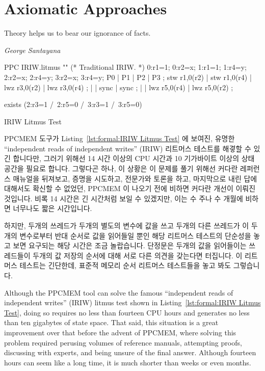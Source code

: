 
\section{Axiomatic Approaches}
\label{sec:formal:Axiomatic Approaches}
%
\epigraph{Theory helps us to bear our ignorance of facts.}
	{\emph{George Santayana}}

\begin{listing}[tb]
\begin{linelabel}
\begin{VerbatimL}[commandchars=\%\@\$]
PPC IRIW.litmus
""
(* Traditional IRIW. *)
{
0:r1=1; 0:r2=x;
1:r1=1;         1:r4=y;
        2:r2=x; 2:r4=y;
        3:r2=x; 3:r4=y;
}
P0           | P1           | P2           | P3           ;
stw r1,0(r2) | stw r1,0(r4) | lwz r3,0(r2) | lwz r3,0(r4) ;
             |              | sync         | sync         ;
             |              | lwz r5,0(r4) | lwz r5,0(r2) ;

exists
(2:r3=1 /\ 2:r5=0 /\ 3:r3=1 /\ 3:r5=0)
\end{VerbatimL}
\end{linelabel}
\caption{IRIW Litmus Test}
\label{lst:formal:IRIW Litmus Test}
\end{listing}

PPCMEM 도구가
Listing~\ref{lst:formal:IRIW Litmus Test} 에 보여진,
유명한 ``independent reads of independent writes'' (IRIW) 리트머스 테스트를
해곃할 수 있긴 합니다만, 그러기 위해선 14 시간 이상의 CPU 시간과 10 기가바이트
이상의 상태공간을 필요로 합니다.
그렇다곤 하나, 이 상황은 이 문제를 풀기 위해선 커다란 레퍼런스 매뉴얼을
뒤져보고, 증명을 시도하고, 전문가와 토론을 하고, 마지막으로 내린 답에 대해서도
확신할 수 없었던, PPCMEM 이 나오기 전에 비하면 커다란 개선이 이뤄진 것입니다.
비록 14 시간은 긴 시간처럼 보일 수 있겠지만, 이는 수 주나 수 개월에 비하면
너무나도 짧은 시간입니다.

하지만, 두개의 쓰레드가 두개의 별도의 변수에 값을 쓰고 두개의 다른 쓰레드가 이
두개의 변수로부터 반대 순서로 값을 읽어들일 뿐인 해당 리트머스 테스트의
단순성을 놓고 보면 요구되는 해당 시간은 조금 놀랍습니다.
단정문은 두개의 값을 읽어들이는 쓰레드들이 두개의 값 저장의 순서에 대해 서로
다른 의견을 갖는다면 터집니다.
이 리트머스 테스트는 긴단한데, 표준적 메모리 순서 리트머스 테스트들을 놓고 봐도
그렇습니다.
\iffalse

Although the PPCMEM tool can solve the famous ``independent reads of
independent writes'' (IRIW) litmus test shown in
Listing~\ref{lst:formal:IRIW Litmus Test}, doing so requires no less than
fourteen CPU hours and generates no less than ten gigabytes of state space.
That said, this situation is a great improvement over that before the advent
of PPCMEM, where solving this problem required perusing volumes of
reference manuals, attempting proofs, discussing with experts, and
being unsure of the final answer.
Although fourteen hours can seem like a long time, it is much shorter
than weeks or even months.

